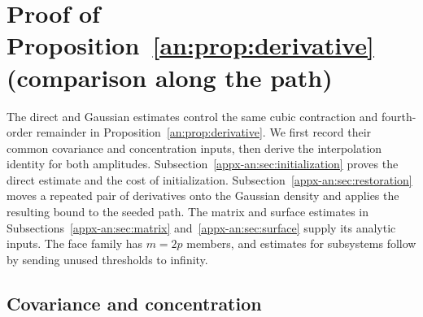 \documentclass[11pt,letterpaper]{article}
\theoremstyle{remark}
\begin{document}
\section{Proof of Proposition~\ref*{an:prop:derivative} (comparison along the path)}
\label{appx-sec:support}

The direct and Gaussian estimates control the same cubic contraction
and fourth-order remainder in Proposition~\ref{an:prop:derivative}.
We first record their common covariance and concentration inputs,
then derive the interpolation identity for both amplitudes.
Subsection~\ref{appx-an:sec:initialization} proves the
direct estimate and the cost of initialization. Subsection~\ref{appx-an:sec:restoration}
moves a repeated pair of derivatives onto the Gaussian density and
applies the resulting bound to the seeded path.
The matrix and surface estimates in Subsections~\ref{appx-an:sec:matrix}
and~\ref{appx-an:sec:surface} supply its analytic inputs. The face
family has \(m=2p\) members, and estimates for subsystems follow by
sending unused thresholds to infinity.

\subsection{Covariance and concentration}
\label{appx-an:sec:coords}
\end{document}
